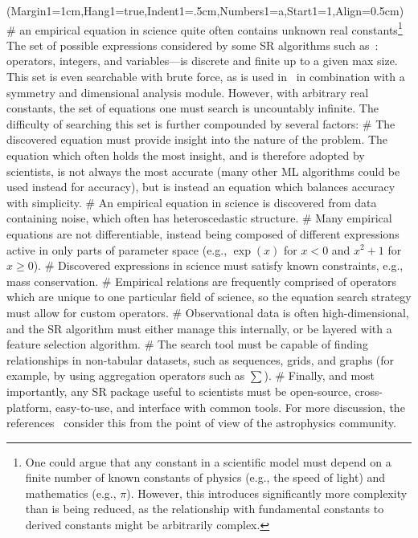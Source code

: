 \documentclass[letterpaper,twocolumn]{scrartcl}
\begin{document}
\begin{linenumbers}
\begin{easylist}
\ListProperties(Margin1=1cm,Hang1=true,Indent1=.5cm,Numbers1=a,Start1=1,Align=0.5cm)
#
an empirical equation in science quite often contains unknown real constants\footnote{One could argue that any constant in a scientific model must depend on a finite number of known constants of physics (e.g., the speed of light) and mathematics (e.g., $\pi$). However, this introduces significantly more complexity than is being reduced, as the relationship with fundamental constants to derived constants might be arbitrarily complex.}
The set of possible expressions considered by some SR algorithms such as~\cite{udrescuAIFeynmanParetooptimal2020}: operators, integers, and variables---is discrete and finite up to a given max size.
This set is even searchable with brute force, as is used in~\cite{udrescuAIFeynmanParetooptimal2020} in combination with a symmetry and dimensional analysis module.
However, with arbitrary real constants, the set of equations one must search is uncountably infinite.
The difficulty of searching this set is further compounded by several factors:
#
The discovered equation must provide insight into the nature of the problem.
The equation which often holds the most insight, and is therefore adopted by scientists, is not always the most accurate (many other ML algorithms could be used instead for accuracy), but is instead an equation which balances accuracy with simplicity.
#
An empirical equation in science is discovered from data containing noise, which often has heteroscedastic structure.
#
Many empirical equations are not differentiable, instead being composed of different expressions active in only parts of parameter space (e.g., $\exp(x)$ for $x<0$ and $x^2+1$ for $x\geq 0$).
#
Discovered expressions in science must satisfy known constraints, e.g., mass conservation.
#
Empirical relations are frequently comprised of operators which are unique to one particular field of science, so the equation search strategy must allow for custom operators.
#
Observational data is often high-dimensional, and the SR algorithm must either manage this internally, or be layered with a feature selection algorithm.
#
The search tool must be capable of finding relationships in non-tabular datasets, such as sequences, grids, and graphs (for example, by using aggregation operators such as $\sum$). #
Finally, and most importantly, any SR package useful to scientists must be open-source, cross-platform, easy-to-use, and interface with common tools.
For more discussion, the references~\cite{price-whelanAstropyProjectBuilding2018,astropycollaborationAstropyProjectSustaining2022} consider this from the point of view of the astrophysics community.
\end{easylist}



\end{linenumbers}
\end{document}
